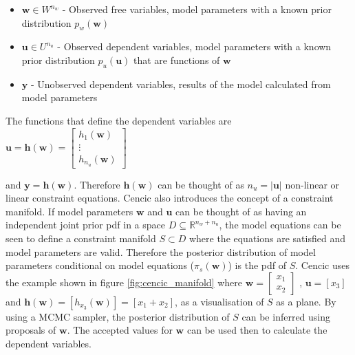 \documentclass[ %
                    author={Tom Jager},
                supervisor={Dr. Daniel Schien},
                    degree={MEng},
                     title={A Bayesian Inference Engine for UMIS Structured Data},
                  subtitle={},
                      type={research},
                      year={2019} ]{dissertation}
\begin{document}
\begin{itemize}
    \item $\bm{w} \in W^{n_w}$ - Observed free variables, model parameters with a known prior distribution $p_w(\bm{w})$
    \item $\bm{u} \in U^{n_u}$ - Observed dependent variables, model parameters with a known prior distribution $p_u(\bm{u})$ that are functions of $\bm{w}$
    \item $\bm{y}$ - Unobserved dependent variables, results of the model calculated from model parameters
\end{itemize}

The functions that define the dependent variables are $\bm{u} = \bm{h}(\bm{w}) = \begin{bmatrix}
    h_1(\bm{w}) \\
    \vdots \\
    h_{n_u}(\bm{w})
\end{bmatrix}$

and $\bm{y} = \bm{h}(\bm{w})$. Therefore $\bm{h}(\bm{w})$ can be thought of as $n_u = |\bm{u}|$ non-linear or linear constraint equations. Cencic also introduces the concept of a constraint manifold. If model parameters $\bm{w}$ and $\bm{u}$ can be thought of as having an independent joint prior pdf in a space $D \subseteq \mathbb{R}^{n_w + n_u}$, the model equations can be seen to define a constraint manifold $S \subset D$ where the equations are satisfied and model parameters are valid. Therefore the posterior distribution of model parameters conditional on model equations ($\pi_s(\bm{w})$) is the pdf of $S$. Cencic uses the example shown in figure \ref{fig:cencic_manifold} where $\bm{w} = \begin{bmatrix}
    x_1 \\
    x_2
\end{bmatrix}$
, $\bm{u} = [x_3]$ and $\bm{h}(\bm{w}) = [h_{x_3}(\bm{w})] = [x_1 + x_2]$, as a visualisation of $S$ as a plane. By using a MCMC sampler, the posterior distribution of $S$ can be inferred using proposals of $\bm{w}$. The accepted values for $\bm{w}$ can be used then to calculate the dependent variables.
\end{document}

